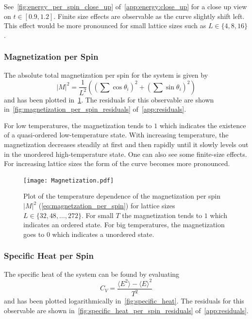 See~\cref{fig:energy_per_spin_close_up} of~\cref{app:energy:close_up} for a close up view on $t \in [\num{0.9}, \num{1.2}]$. Finite size effects are observable as the curve slightly shift left. This effect would be more pronounced for small lattice sizes such as $L \in \{4, 8, 16\}$.

\subsubsection{Magnetization per Spin}\label{sec:magnetization_per_spin}
The absolute total magnetization per spin for the system is given by
\begin{equation}\label{eq:magnetzation_per_spin}
	{\lvert M \rvert}^2 = \frac{1}{L^2} \left( \left( \sum{\cos{\theta_i}} \right)^2 + \left( \sum{\sin{\theta_i}} \right)^2 \right)
\end{equation}
and has been plotted in~\cref{fig:magnetization_per_spin}. The residuals for this observable are shown in~\cref{fig:magnetization_per_spin_residuals} of~\cref{app:residuals}.

For low temperatures, the magnetization tends to $\num{1}$ which indicates the existence of a quasi-ordered low-temperature state. With increasing temperature, the magnetization decreases steadily at first and then rapidly until it slowly levels out in the unordered high-temperature state. One can also see  some finite-size effects. For increasing lattice sizes the form of the curve becomes more pronounced.
\begin{figure}[!htb]
	\centering
	\texttt{[image: Magnetization.pdf]}
	\caption[Temperature dependence of the magnetization per spin ${\lvert M \rvert}^2$]{Plot of the temperature dependence of the magnetization per spin ${\lvert M \rvert}^2$ (\cref{eq:magnetzation_per_spin}) for lattice sizes $L\in\{32, 48, \dots, 272\}$. For small $T$ the magnetization tends to $1$ which indicates an ordered state. For big temperatures, the magnetization goes to $0$ which indicates a unordered state.}
	\label{fig:magnetization_per_spin}
\end{figure}

\subsubsection{Specific Heat per Spin}\label{sec:specific_heat_per_spin}
The specific heat of the system can be found by evaluating
\begin{equation}\label{eq:specific_heat_per_spin}
	C_V = \frac{\langle E^2 \rangle - {\langle E \rangle}^2}{T^2}
\end{equation}
and has been plotted logarithmically in~\cref{fig:specific_heat}. The residuals for this observable are shown in~\cref{fig:specific_heat_per_spin_residuals} of~\cref{app:residuals}.

